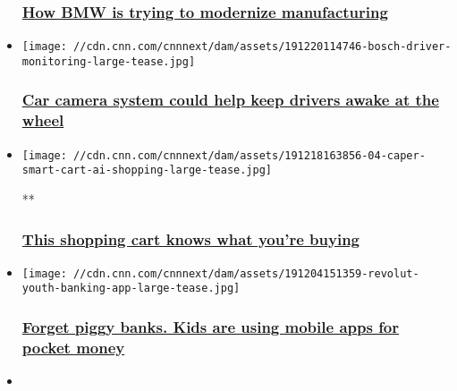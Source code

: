 \begin{itemize}
  \hypertarget{how-bmw-is-trying-to-modernize-manufacturing}{%
  \subsubsection{\texorpdfstring{\href{/2020/01/23/business/bmw-regensburg-smart-factory/index.html}{How
  BMW is trying to modernize
  manufacturing}}{How BMW is trying to modernize manufacturing}}\label{how-bmw-is-trying-to-modernize-manufacturing}}
\item
  \href{/2019/12/27/business/technology-detects-drowsy-drivers/index.html}{}

  \texttt{[image: //cdn.cnn.com/cnnnext/dam/assets/191220114746-bosch-driver-monitoring-large-tease.jpg]}

  \hypertarget{car-camera-system-could-help-keep-drivers-awake-at-the-wheel}{%
  \subsubsection{\texorpdfstring{\href{/2019/12/27/business/technology-detects-drowsy-drivers/index.html}{Car
  camera system could help keep drivers awake at the
  wheel}}{Car camera system could help keep drivers awake at the wheel}}\label{car-camera-system-could-help-keep-drivers-awake-at-the-wheel}}
\item
  \href{/videos/business/2019/12/20/caper-ai-shopping-cart-orig.cnn-business}{}

  \texttt{[image: //cdn.cnn.com/cnnnext/dam/assets/191218163856-04-caper-smart-cart-ai-shopping-large-tease.jpg]}

  **

  \hypertarget{this-shopping-cart-knows-what-youre-buying}{%
  \subsubsection{\texorpdfstring{\href{/videos/business/2019/12/20/caper-ai-shopping-cart-orig.cnn-business}{This
  shopping cart knows what you're
  buying}}{This shopping cart knows what you're buying}}\label{this-shopping-cart-knows-what-youre-buying}}
\item
  \href{/2019/12/16/business/digital-banking-for-children/index.html}{}

  \texttt{[image: //cdn.cnn.com/cnnnext/dam/assets/191204151359-revolut-youth-banking-app-large-tease.jpg]}

  \hypertarget{forget-piggy-banks-kids-are-using-mobile-apps-for-pocket-money}{%
  \subsubsection{\texorpdfstring{\href{/2019/12/16/business/digital-banking-for-children/index.html}{Forget
  piggy banks. Kids are using mobile apps for pocket
  money}}{Forget piggy banks. Kids are using mobile apps for pocket money}}\label{forget-piggy-banks-kids-are-using-mobile-apps-for-pocket-money}}
\item
  \href{/2019/12/03/tech/india-pollution-crisis-tech-cities/index.html}{}


\end{itemize}
